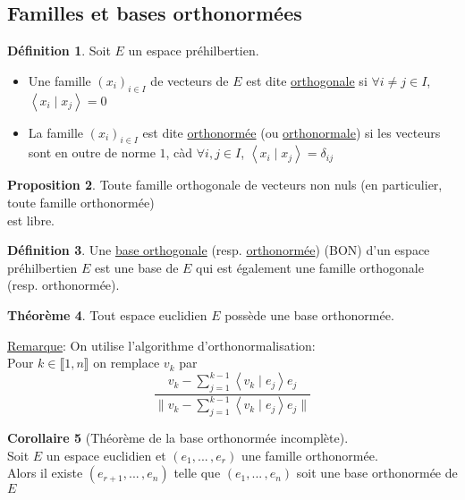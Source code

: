 \documentclass[10pt,a4paper]{article}
\theoremstyle{definition}
\newtheorem{proposition}{Proposition}[section]
\newtheorem{theorem}[proposition]{Théorème}
\newtheorem{corollaire}[proposition]{Corollaire}
\newtheorem{definition}[proposition]{Définition}
\newcommand{\vp}[2]{\left< #1 \mid #2 \right>}
\begin{document}
\subsection{Familles et bases orthonormées}
\begin{definition}
Soit $E$ un espace préhilbertien.
\begin{itemize}
\item Une famille $(x_i)_{i \in I}$ de vecteurs de $E$ est dite \uline{orthogonale} si $\forall i \neq j \in I$, $\vp{x_i}{x_j} = 0$
\item La famille $(x_i)_{i \in I}$ est dite \uline{orthonormée} (ou \uline{orthonormale}) si les vecteurs sont en outre de norme $1$, càd $\forall i, j \in I$, $\vp{x_i}{x_j} = \delta_{ij}$
\end{itemize}
\end{definition}
\begin{proposition}
Toute famille orthogonale de vecteurs non nuls (en particulier, toute famille orthonormée) \\
est libre.
\end{proposition}
\begin{definition}
Une \uline{base orthogonale} (resp. \uline{orthonormée}) (BON) d'un espace préhilbertien $E$ est une base de $E$ qui est également une famille orthogonale (resp. orthonormée).
\end{definition}
\begin{theorem}
Tout espace euclidien $E$ possède une base orthonormée.
\end{theorem}
\noindent \uline{Remarque}: On utilise l'algorithme d'orthonormalisation: \\
Pour $k \in \llbracket 1, n \rrbracket$ on remplace $v_k$ par 
\[ \frac{v_k - \sum\limits_{j = 1}^{k - 1} \vp{v_k}{e_j} e_j}{\lVert v_k - \sum\limits_{j = 1}^{k - 1} \vp{v_k}{e_j} e_j \rVert} \]
\begin{corollaire}[Théorème de la base orthonormée incomplète]
\hfill \\
Soit $E$ un espace euclidien et $(e_1, ...\,, e_r)$ une famille orthonormée. \\
Alors il existe $(e_{r + 1}, ...\,, e_n)$ telle que $(e_1, ...\,, e_n)$ soit une base orthonormée de $E$
\end{corollaire}

\pagebreak
\end{document}
